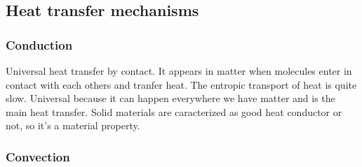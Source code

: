  \subsection{Heat transfer mechanisms}
 	\subsubsection{Conduction}
 		Universal heat transfer by contact. It appears in matter when molecules enter in contact with each others and tranfer heat. The entropic transport of heat is quite slow. Universal because it can happen everywhere we have matter and is the main heat transfer. Solid materials are caracterized as good heat conductor or not, so it's a material property.
 
 	\subsubsection{Convection}
